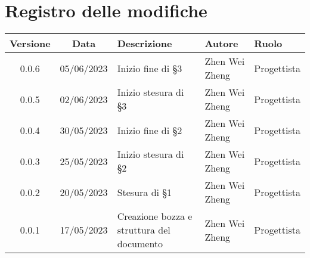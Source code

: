 \section*{Registro delle modifiche}
\begin{center}
\setlength\extrarowheight{5pt}
\renewcommand\tabularxcolumn[1]{>{\Centering}m{#1}}
\begin{tabularx}{\textwidth}{| c | c | X | X | X |} 
	\hline
	\rowcolor{white}
	\textbf{Versione} & \textbf{Data} & \textbf{Descrizione} & \textbf{Autore} & \textbf{Ruolo}\\
	\hline
	0.0.6 & 05/06/2023 & Inizio fine di §3 & Zhen Wei Zheng & Progettista\\
	\hline
	0.0.5 & 02/06/2023 & Inizio stesura di §3 & Zhen Wei Zheng & Progettista\\
	\hline
	0.0.4 & 30/05/2023 & Inizio fine di §2 & Zhen Wei Zheng & Progettista\\
	\hline
	0.0.3 & 25/05/2023 & Inizio stesura di §2 & Zhen Wei Zheng & Progettista\\
	\hline
	0.0.2 & 20/05/2023 & Stesura di §1 & Zhen Wei Zheng & Progettista\\
	\hline
	0.0.1 & 17/05/2023 & Creazione bozza e struttura del documento & Zhen Wei Zheng & Progettista\\
	\hline
	\end{tabularx}
\end{center}
